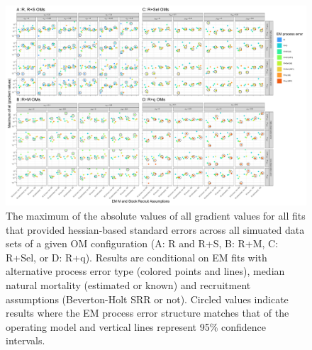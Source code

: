 \documentclass[
  12pt,
]{article}
\begin{document}
\begin{landscape}
\begin{figure}
\begin{center}
\includegraphics[width = 1.4\textwidth]{hess_grad_convergence_plots}
\end{center}
\caption{The maximum of the absolute values of all gradient values for all fits that provided hessian-based standard errors across all simuated data sets of a given OM configuration (A: R and R+S, B: R+M, C: R+Sel, or D: R+q).  Results are conditional on EM fits with alternative process error type (colored points and lines), median natural mortality (estimated or known) and recruitment assumptions (Beverton-Holt SRR or not). Circled values indicate results where the EM process error structure matches that of the operating model and vertical lines represent 95\% confidence intervals.}\label{hess_grad}
\end{figure}
\end{landscape}
\end{document}
